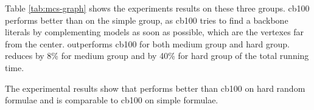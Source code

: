 Table \ref{tab:mcs-graph} shows the experiments results on these three groups. cb100 performs better than \tool on the simple group, as cb100 tries to find a backbone literals by complementing models as soon as possible, which are the vertexes far from the center.
\tool outperforms cb100 for both medium group and hard group.
\tool reduces by 8\% for medium group and by 40\% for hard group of the total running time.





The experimental results show that \tool performs better than cb100 on hard random formulae and is comparable to cb100 on simple formulae.




